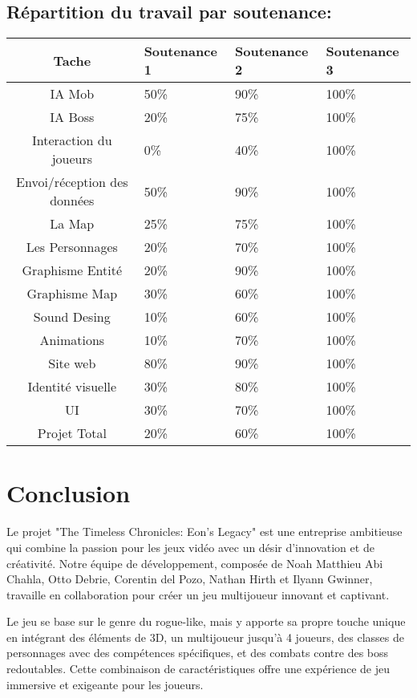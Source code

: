 \documentclass{article}
\begin{document}
\subsection*{Répartition du travail par soutenance:}
\begin{tabularx}{\textwidth}{|C|X|X|X|}\hline
    Tache & Soutenance 1 & Soutenance 2 & Soutenance 3 \\ \hline
    IA Mob & 50\% & 90\% & 100\% \\ \hline
    IA Boss & 20\% & 75\% & 100\% \\ \hline
    Interaction du joueurs & 0\% & 40\% & 100\% \\ \hline
    Envoi/réception des données & 50\% & 90\% & 100\% \\ \hline
    La Map & 25\% & 75\% & 100\% \\ \hline
    Les Personnages & 20\% & 70\% & 100\% \\ \hline
    Graphisme Entité & 20\% & 90\% & 100\% \\ \hline
    Graphisme Map & 30\% & 60\% & 100\% \\ \hline
    Sound Desing & 10\% & 60\% & 100\% \\ \hline
    Animations & 10\% & 70\% & 100\% \\ \hline
    Site web & 80\% & 90\% & 100\% \\ \hline
    Identité visuelle & 30\% & 80\% & 100\% \\ \hline
    UI & 30\% & 70\% & 100\% \\ \hline \hline
    Projet Total & 20\% & 60\% & 100\% \\ \hline
\end{tabularx}

\section{Conclusion}
Le projet "The Timeless Chronicles: Eon's Legacy" est une entreprise ambitieuse qui combine la passion pour les jeux vidéo avec un désir d'innovation et de créativité. Notre équipe de développement, composée de Noah Matthieu Abi Chahla, Otto Debrie, Corentin del Pozo, Nathan Hirth et Ilyann Gwinner, travaille en collaboration pour créer un jeu multijoueur innovant et captivant.

Le jeu se base sur le genre du rogue-like, mais y apporte sa propre touche unique en intégrant des éléments de 3D, un multijoueur jusqu'à 4 joueurs, des classes de personnages avec des compétences spécifiques, et des combats contre des boss redoutables. Cette combinaison de caractéristiques offre une expérience de jeu immersive et exigeante pour les joueurs.
\end{document}
